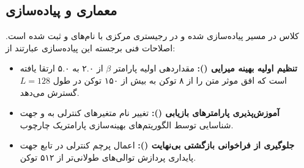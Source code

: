 \subsection{معماری و پیاده‌سازی}
کلاس  در مسیر  پیاده‌سازی شده و در رجیستری مرکزی با نام‌های  و  ثبت شده است. اصلاحات فنی برجسته این پیاده‌سازی عبارتند از:
\begin{itemize}
    \item \textbf{تنظیم اولیه بهینه میرایی ():} مقداردهی اولیه پارامتر $\beta$ از ۲.۰ به ۵.۰ ارتقا یافته است که افق موثر متن را از ۸ توکن به بیش از ۱۵۰ توکن در طول $L=128$ گسترش می‌دهد.
    \item \textbf{آموزش‌پذیری پارامترهای بازیابی ():} تغییر نام متغیرهای کنترلی به  و  جهت شناسایی توسط الگوریتم‌های بهینه‌سازی پارامتریک چارچوب.
    \item \textbf{جلوگیری از فراخوانی بازگشتی بی‌نهایت ():} اعمال پرچم کنترلی  در تابع  جهت پایداری پردازش توالی‌های طولانی‌تر از ۵۱۲ توکن.
\end{itemize}
